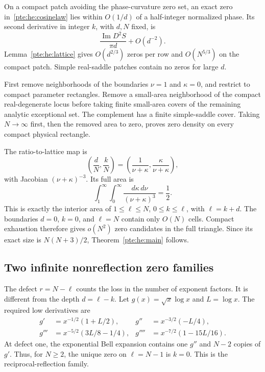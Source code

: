 \documentclass[11pt,a4paper]{article}
\numberwithin{equation}{section}
\theoremstyle{definition}
\theoremstyle{plain}
\begin{document}
On a compact patch avoiding the phase-curvature zero set, an exact zero in~\eqref{pte:he:cosinelaw} lies within $O(1/d)$ of a half-integer normalized phase. Its second derivative in integer $k$, with $d,N$ fixed, is
\[
 \frac{\operatorname{Im}D^2S}{\pi d}+O(d^{-2}).
\]
Lemma~\ref{pte:he:lattice} gives $O(d^{2/3})$ zeros per row and $O(N^{5/3})$ on the compact patch. Simple real-saddle patches contain no zeros for large $d$.

First remove neighborhoods of the boundaries $\nu=1$ and $\kappa=0$, and restrict to compact parameter rectangles. Remove a small-area neighborhood of the compact real-degenerate locus before taking finite small-area covers of the remaining analytic exceptional set. The complement has a finite simple-saddle cover. Taking $N\to\infty$ first, then the removed area to zero, proves zero density on every compact physical rectangle.

The ratio-to-lattice map is
\[
 \left(\frac dN,\frac kN\right)
 =\left(\frac1{\nu+\kappa},\frac\kappa{\nu+\kappa}\right),
\]
with Jacobian $(\nu+\kappa)^{-3}$. Its full area is
\[
 \int_1^\infty\int_0^\infty\frac{d\kappa\,d\nu}{(\nu+\kappa)^3}
 =\frac12.
\]
This is exactly the interior area of $1\le\ell\le N$, $0\le k\le\ell$, with $\ell=k+d$. The boundaries $d=0$, $k=0$, and $\ell=N$ contain only $O(N)$ cells. Compact exhaustion therefore gives $o(N^2)$ zero candidates in the full triangle. Since its exact size is $N(N+3)/2$, Theorem~\ref{pte:he:main} follows.

\subsection{Two infinite nonreflection zero families}\label{pte:he:diagonals}
The defect $r=N-\ell$ counts the loss in the number of exponent factors. It is different from the depth $d=\ell-k$. Let $g(x)=\sqrt{x}\log x$ and $L=\log x$. The required low derivatives are
\begin{align*}
 g'&=x^{-1/2}(1+L/2),&
 g''&=x^{-3/2}(-L/4),\\
 g'''&=x^{-5/2}(3L/8-1/4),&
 g''''&=x^{-7/2}(1-15L/16).
\end{align*}
At defect one, the exponential Bell expansion contains one $g''$ and $N-2$ copies of $g'$. Thus, for $N\ge2$, the unique zero on $\ell=N-1$ is $k=0$. This is the reciprocal-reflection family.
\end{document}

